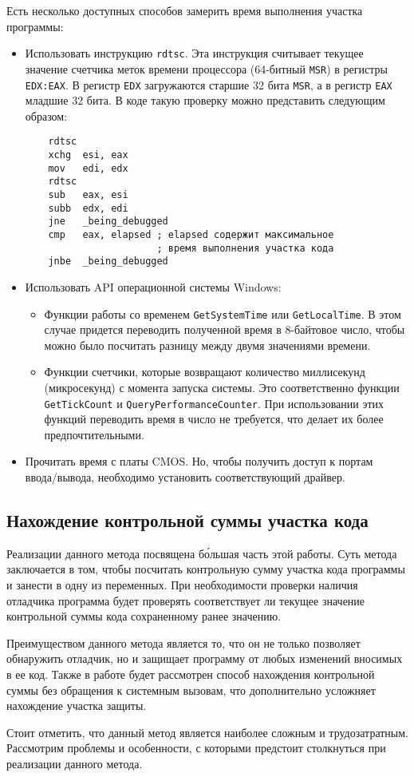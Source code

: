 Есть несколько доступных способов замерить время выполнения участка программы:
\begin{itemize}
  \item Использовать инструкцию \verb!rdtsc!. Эта инструкция считывает текущее
    значение счетчика меток времени процессора (64-битный \verb!MSR!) в регистры
    \verb!EDX:EAX!. В регистр \verb!EDX! загружаются старшие 32 бита \verb!MSR!,
    а в регистр \verb!EAX! младшие 32 бита. В коде такую проверку можно
    представить следующим образом:
    \begin{verbatim}
    rdtsc
    xchg  esi, eax
    mov   edi, edx
    rdtsc
    sub   eax, esi
    subb  edx, edi
    jne   _being_debugged
    cmp   eax, elapsed ; elapsed содержит максимальное
                       ; время выполнения участка кода
    jnbe  _being_debugged
    \end{verbatim}

  \item Использовать API операционной системы Windows:
    \begin{itemize}
      \item Функции работы со временем \verb!GetSystemTime! или
        \verb!GetLocalTime!. В этом случае придется переводить полученной время
        в 8-байтовое число, чтобы можно было посчитать разницу между двумя
        значениями времени.
      \item Функции счетчики, которые возвращают количество миллисекунд
        (микросекунд) с момента запуска системы. Это соответственно функции
        \verb!GetTickCount! и \verb!QueryPerformanceCounter!. При использовании
        этих функций переводить время в число не требуется, что делает их более
        предпочтительными.
    \end{itemize}

  \item Прочитать время с платы CMOS. Но, чтобы получить доступ к портам
    ввода/вывода, необходимо установить соответствующий драйвер.
\end{itemize}

\subsection{Нахождение контрольной суммы участка кода}

Реализации данного метода посвящена б\'{о}льшая часть этой работы. Суть метода
заключается в том, чтобы посчитать контрольную сумму участка кода программы и
занести в одну из переменных. При необходимости проверки наличия отладчика
программа будет проверять соответствует ли текущее значение контрольной суммы
кода сохраненному ранее значению. 

Преимуществом данного метода является то, что он не только позволяет обнаружить
отладчик, но и защищает программу от любых изменений вносимых в ее код. Также
в работе будет рассмотрен способ нахождения контрольной суммы без обращения к
системным вызовам, что дополнительно усложняет нахождение участка защиты.

Стоит отметить, что данный метод является наиболее сложным и трудозатратным.
Рассмотрим проблемы и особенности, с которыми предстоит столкнуться при
реализации данного метода.
